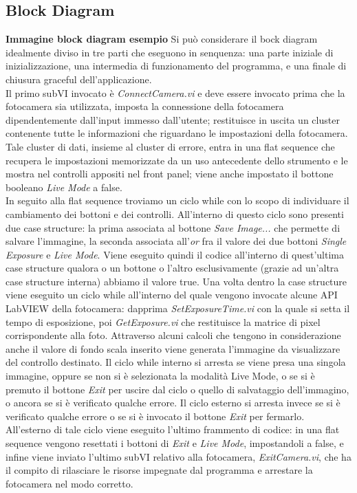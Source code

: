 \subsection{Block Diagram}
\textbf{Immagine block diagram esempio}
Si può considerare il bock diagram idealmente diviso in tre parti che eseguono in senquenza: una parte iniziale di inizializzazione, una intermedia di funzionamento del programma, e una finale di chiusura graceful dell'applicazione.\\
Il primo subVI invocato è \emph{ConnectCamera.vi} e deve essere invocato prima che la fotocamera sia utilizzata, imposta la connessione della fotocamera dipendentemente dall'input immesso dall'utente; restituisce in uscita un cluster contenente tutte le informazioni che riguardano le impostazioni della fotocamera. Tale cluster di dati, insieme al cluster di errore, entra in una flat sequence che recupera le impostazioni memorizzate da un uso antecedente dello strumento e le mostra nel controlli appositi nel front panel; viene anche impostato il bottone booleano \textit{Live Mode} a false.\\
In seguito alla flat sequence troviamo un ciclo while con lo scopo di individuare il cambiamento dei bottoni e dei controlli. All'interno di questo ciclo sono presenti due case structure: la prima associata al bottone \textit{Save Image...} che permette di salvare l'immagine, la seconda associata all'\textit{or} fra il valore dei due bottoni \textit{Single Exposure} e \textit{Live Mode}. Viene eseguito quindi il codice all'interno di quest'ultima case structure qualora o un bottone o l'altro esclusivamente (grazie ad un'altra case structure interna) abbiamo il valore true. Una volta dentro la case structure viene eseguito un ciclo while all'interno del quale vengono invocate alcune API LabVIEW della fotocamera: dapprima \emph{SetExposureTime.vi} con la quale si setta il tempo di esposizione, poi \emph{GetExposure.vi} che restituisce la matrice di pixel corrispondente alla foto. Attraverso alcuni calcoli che tengono in considerazione anche il valore di fondo scala inserito viene generata l'immagine da visualizzare del controllo destinato. Il ciclo while interno si arresta se viene presa una singola immagine, oppure se non si è selezionata la modalità Live Mode, o se si è premuto il bottone \textit{Exit} per uscire dal ciclo o quello di salvataggio dell'immagino, o ancora se si è verificato qualche errore. Il ciclo esterno si arresta invece se si è verificato qualche errore o se si è invocato il bottone \textit{Exit} per fermarlo.\\
All'esterno di tale ciclo viene eseguito l'ultimo frammento di codice: in una flat sequence vengono resettati i bottoni di \textit{Exit} e \textit{Live Mode}, impostandoli a false, e infine viene inviato l'ultimo subVI relativo alla fotocamera, \emph{ExitCamera.vi}, che ha il compito di rilasciare le risorse impegnate dal programma e arrestare la fotocamera nel modo corretto.